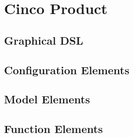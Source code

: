 \chapter{Cinco Product}\label{ch:CP}
\section{Graphical DSL}
\section{Configuration Elements}
\section{Model Elements}
\section{Function Elements}